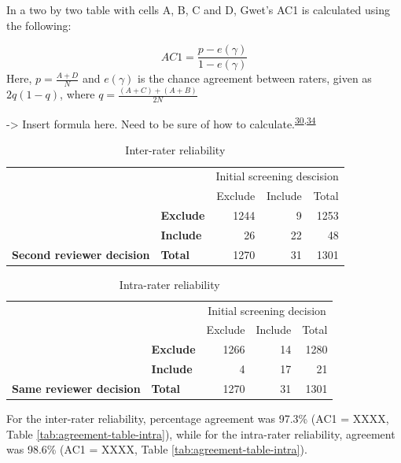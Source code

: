 \documentclass[a4paper, twoside]{templates/ociamthesis}
\begin{document}
In a two by two table with cells A, B, C and D, Gwet's AC1 is calculated using the following:

\[AC1 = \frac{p-e(\gamma)}{1-e(\gamma)}\]
Here, \(p = \frac{A+D}{N}\) and \(e(\gamma)\) is the chance agreement between raters, given as \(2q(1-q)\), where \(q = \frac{(A+C)+(A+B)}{2N}\)

-\textgreater{} Insert formula here. Need to be sure of how to calculate.\textsuperscript{\protect\hyperlink{ref-gwet2008}{30},\protect\hyperlink{ref-sim2005}{34}}

\begin{table}

\caption{\label{tab:agreementtableinter}Inter-rater reliability}
\centering
\begin{tabular}[t]{>{}l>{}lr>{}r|r}
\toprule
\multicolumn{2}{c}{ } & \multicolumn{3}{c}{Initial screening descision} \\
\cmidrule(l{3pt}r{3pt}){3-5}
 &  & Exclude & Include & Total\\
\midrule
 & \textbf{Exclude} & 1244 & 9 & 1253\\
\cmidrule{2-5}
 & \textbf{Include} & 26 & 22 & 48\\
\cmidrule{2-5}
\multirow{-3}{*}{\raggedright\arraybackslash \textbf{Second reviewer decision}} & \textbf{Total} & 1270 & 31 & 1301\\
\bottomrule
\end{tabular}
\end{table}

\begin{table}

\caption{\label{tab:agreementtableintra}Intra-rater reliability}
\centering
\begin{tabular}[t]{>{}l>{}l|r>{}r|r}
\toprule
\multicolumn{2}{c}{ } & \multicolumn{3}{c}{Initial screening decision} \\
\cmidrule(l{3pt}r{3pt}){3-5}
 &  & Exclude & Include & Total\\
\midrule
 & \textbf{Exclude} & 1266 & 14 & 1280\\
\cmidrule{2-5}
 & \textbf{Include} & 4 & 17 & 21\\
\cmidrule{2-5}
\multirow{-3}{*}{\raggedright\arraybackslash \textbf{Same reviewer decision}} & \textbf{Total} & 1270 & 31 & 1301\\
\bottomrule
\end{tabular}
\end{table}

For the inter-rater reliability, percentage agreement was 97.3\% (AC1 = XXXX, Table \ref{tab:agreement-table-intra}), while for the intra-rater reliability, agreement was 98.6\% (AC1 = XXXX, Table \ref{tab:agreement-table-intra}).
\end{document}

